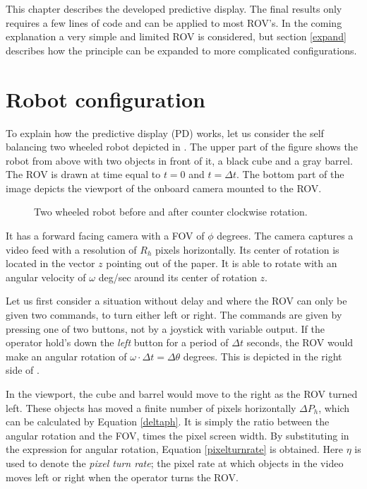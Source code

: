 This chapter describes the developed predictive display. The final results only requires a few lines of code and can be applied to most ROV's. In the coming explanation a very simple and limited ROV is considered, but section \ref{expand} describes how the principle can be expanded to more complicated configurations.

\section{Robot configuration} \label{chp31}
 
To explain how the predictive display (PD) works, let us consider the self balancing two wheeled robot depicted in . The upper part of the figure shows the robot from above with two objects in front of it, a black cube and a gray barrel. The ROV is drawn at time equal to $t=0$ and $t=\Delta t$. The bottom part of the image depicts the viewport of the onboard camera mounted to the ROV.


\begin{figure}[h!]    
    \centering           
    \def\svgwidth{.75\columnwidth}
    
    \caption{Two wheeled robot before and after counter clockwise rotation.}
    \label{twoWheeled}
\end{figure}


It has a forward facing camera with a FOV of $\phi$ degrees. The camera captures a video feed with a resolution of $R_h$ pixels horizontally. Its center of rotation is located in the vector $z$ pointing out of the paper. It is able to rotate with an angular velocity of $\omega$ deg/sec around its center of rotation $z$.

Let us first consider a situation without delay and where the ROV can only be given two commands, to turn either left or right. The commands are given by pressing one of two buttons, not by a joystick with variable output. If the operator hold's down the \emph{left} button for a period of $\Delta t$ seconds, the ROV would make an angular rotation of $\omega \cdot \Delta t = \Delta \theta$ degrees. This is depicted in the right side of .

In the viewport, the cube and barrel would move to the right as the ROV turned left. These objects has moved a finite number of pixels horizontally $\Delta P_h$, which can be calculated by Equation \ref{deltaph}. It is simply the ratio between the angular rotation and the FOV, times the pixel screen width. By substituting in the expression for angular rotation, Equation \ref{pixelturnrate} is obtained. Here $\eta$ is used to denote the \textit{pixel turn rate}; the pixel rate at which objects in the video moves left or right when the operator turns the ROV.

